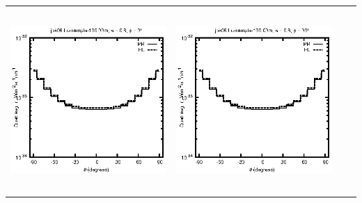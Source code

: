\begin{tabular}{c c c c}
\includegraphics[height=7cm]{../eps/jok06_Lu_sample_100.00m_fwd.eps} &
\includegraphics[height=7cm]{../eps/jok06_Lu_sample_100.00m_cross.eps} \\
\end{tabular}

\pagebreak

